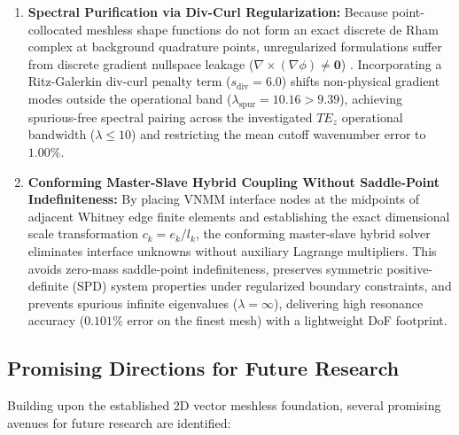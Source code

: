 \documentclass[preprint,12pt]{elsarticle}
\begin{document}
\begin{enumerate}
    \item \textbf{Spectral Purification via Div-Curl Regularization:} 
    Because point-collocated meshless shape functions do not form an exact discrete de Rham complex at background quadrature points, unregularized formulations suffer from discrete gradient nullspace leakage ($\nabla \times (\nabla \phi) \neq \mathbf{0}$) \cite{monk2003finite, bossavit1990spurious}. Incorporating a Ritz-Galerkin div-curl penalty term ($s_{\mathrm{div}} = 6.0$) shifts non-physical gradient modes outside the operational band ($\lambda_{\mathrm{spur}} = 10.16 > 9.39$), achieving spurious-free spectral pairing across the investigated $TE_z$ operational bandwidth ($\lambda \le 10$) and restricting the mean cutoff wavenumber error to $1.00\%$.

    \item \textbf{Conforming Master-Slave Hybrid Coupling Without Saddle-Point Indefiniteness:} 
    By placing VNMM interface nodes at the midpoints of adjacent Whitney edge finite elements and establishing the exact dimensional scale transformation $c_k = e_k / l_k$, the conforming master-slave hybrid solver eliminates interface unknowns without auxiliary Lagrange multipliers. This avoids zero-mass saddle-point indefiniteness, preserves symmetric positive-definite (SPD) system properties under regularized boundary constraints, and prevents spurious infinite eigenvalues ($\lambda = \infty$), delivering high resonance accuracy ($0.101\%$ error on the finest mesh) with a lightweight DoF footprint.
\end{enumerate}

\subsection{Promising Directions for Future Research}
\label{subsec:future_works}

Building upon the established 2D vector meshless foundation, several promising avenues for future research are identified:
\end{document}
